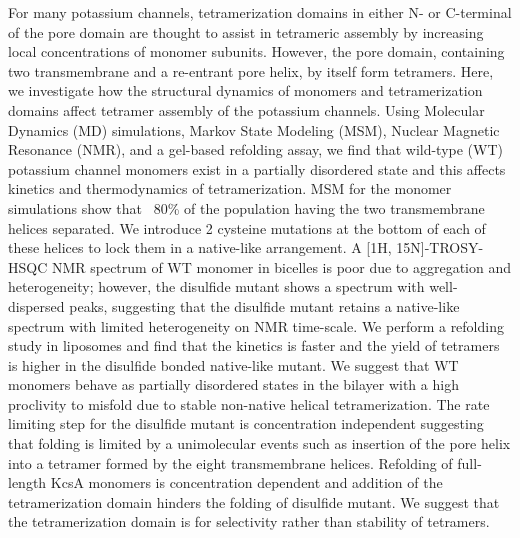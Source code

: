 \documentclass{ucetd}
\begin{document}
\abstract
\par
For many potassium channels, tetramerization domains in either N- or C-terminal of the pore domain are thought to assist in tetrameric assembly by increasing local concentrations of monomer subunits. However, the pore domain, containing two transmembrane and a re-entrant pore helix, by itself form tetramers. Here, we investigate how the structural dynamics of monomers and tetramerization domains affect tetramer assembly of the potassium channels. Using Molecular Dynamics (MD) simulations, Markov State Modeling (MSM), Nuclear Magnetic Resonance (NMR), and a gel-based refolding assay, we find that wild-type (WT) potassium channel monomers exist in a partially disordered state and this affects kinetics and thermodynamics of tetramerization. MSM for the monomer simulations show that ~80\% of the population having the two transmembrane helices separated. We introduce 2 cysteine mutations at the bottom of each of these helices to lock them in a native-like arrangement. A [1H, 15N]-TROSY-HSQC NMR spectrum of WT monomer in bicelles is poor due to aggregation and heterogeneity; however, the disulfide mutant shows a spectrum with well-dispersed peaks, suggesting that the disulfide mutant retains a native-like spectrum with limited heterogeneity on NMR time-scale. We perform a refolding study in liposomes and find that the kinetics is faster and the yield of tetramers is higher in the disulfide bonded native-like mutant. We suggest that WT monomers behave as partially disordered states in the bilayer with a high proclivity to misfold due to stable non-native helical tetramerization. The rate limiting step for the disulfide mutant is concentration independent suggesting that folding is limited by a unimolecular events such as insertion of the pore helix into a tetramer formed by the eight transmembrane helices. Refolding of full-length KcsA monomers is concentration dependent and addition of the tetramerization domain hinders the folding of disulfide mutant. We suggest that the tetramerization domain is for selectivity rather than stability of tetramers.

\mainmatter



\makebibliography

%
%
\end{document}
